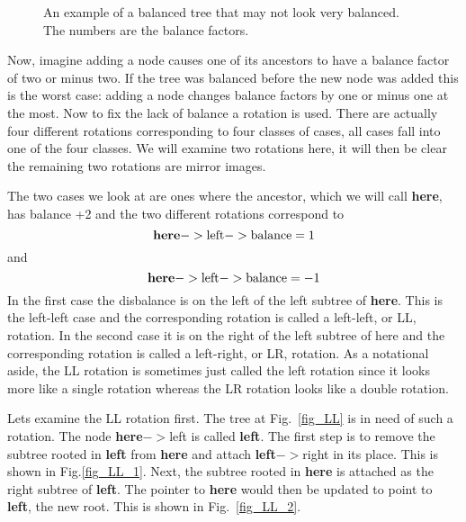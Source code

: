 \documentclass[11pt,a4paper]{scrartcl}
\begin{document}
\begin{figure}
\begin{center}
\end{center}
\caption{An example of a balanced tree that may not look very balanced. The numbers are the balance factors.\label{fig_odd_balance}}
\end{figure}

Now, imagine adding a node causes one of its ancestors to have a
balance factor of two or minus two. If the tree was balanced before
the new node was added this is the worst case: adding a node changes
balance factors by one or minus one at the most. Now to fix the lack
of balance a rotation is used. There are actually four different
rotations corresponding to four classes of cases, all cases fall into
one of the four classes. We will examine two rotations here, it will
then be clear the remaining two rotations are mirror images. 

The two cases we look at are ones where the ancestor, which we will
call {\bf here}, has balance +2 and the two different rotations
correspond to 
\begin{equation}
\mbox{{\bf here}}->\mbox{left}->\mbox{balance}=1 
\end{equation}
and 
\begin{equation}
\mbox{{\bf here}}->\mbox{left}->\mbox{balance}=-1 
\end{equation}
In the first case the disbalance is on the left of the left subtree of
{\bf here}. This is the left-left case and the corresponding rotation is
called a left-left, or LL, rotation. In the second case it is on the
right of the left subtree of here and the corresponding rotation is
called a left-right, or LR, rotation. As a notational aside, the LL
rotation is sometimes just called the left rotation since it looks more
like a single rotation whereas the LR rotation looks like a double
rotation.

Lets examine the LL rotation first. The tree at Fig.~\ref{fig_LL} is
in need of such a rotation. The node {\bf here}$->$left is called {\bf
  left}. The first step is to remove the subtree rooted in {\bf left}
from {\bf here} and attach {\bf left}$->$right in its place. This is
shown in Fig.\ref{fig_LL_1}. Next, the subtree rooted in {\bf here} is
attached as the right subtree of {\bf left}. The pointer to {\bf here}
would then be updated to point to {\bf left}, the new root. This is
shown in Fig.~\ref{fig_LL_2}. 
\end{document}

